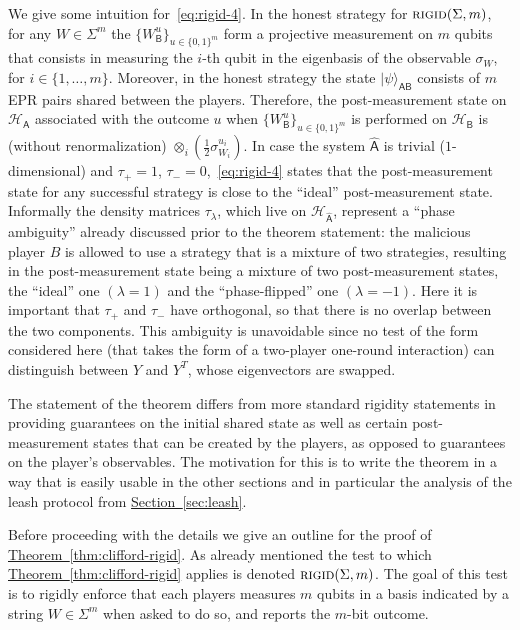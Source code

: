 \documentclass[11pt]{article}
\numberwithin{equation}{section}
\theoremstyle{definition}
\theoremstyle{plain}
\newcommand{\expref}[2]{\hyperref[#2]{#1~\ref{#2}}}
\newcommand{\ket}[1]{|#1\rangle}
\newcommand{\reg}[1]{{\textsf{#1}}}
\newcommand{\mH}{\mathcal{H}}
\newcommand{\rigid}{\textsc{rigid}}
\begin{document}
We give some intuition for~\eqref{eq:rigid-4}. In the honest strategy for $\rigid(\Sigma,m)$, for any $W\in \Sigma^m$ the $\{ W_\reg{B}^u\}_{u\in\{0,1\}^m}$ form a projective measurement on $m$ qubits that consists in measuring the $i$-th qubit in the eigenbasis of the observable $\sigma_{W}$, for $i\in\{1,\ldots,m\}$. Moreover, in the honest strategy the state $\ket{\psi}_{\reg{AB}}$ consists of $m$ EPR pairs shared between the players. Therefore, the post-measurement state on $\mH_\reg{A}$ associated with the outcome $u$ when  $\{ W_\reg{B}^u\}_{u\in\{0,1\}^m}$ is performed on $\mH_\reg{B}$ is (without renormalization) $\otimes_i (\frac{1}{2}\sigma_{W_i}^{u_i})$. In case the system $\hat{\reg{A}}$ is trivial ($1$-dimensional) and $\tau_+=1$, $\tau_-=0$,~\eqref{eq:rigid-4}  states that the post-measurement state for any successful strategy is close to the ``ideal'' post-measurement state. Informally the density matrices $\tau_\lambda$, which live on $\mH_{\hat{\reg{A}}}$, represent a ``phase ambiguity'' already discussed prior to the theorem statement: the malicious player $B$ is allowed to use a strategy that is a mixture of two strategies, resulting in the post-measurement state being a mixture of two post-measurement states, the ``ideal'' one $(\lambda=1)$ and the ``phase-flipped'' one $(\lambda=-1)$. Here it is important that $\tau_+$ and $\tau_-$ have orthogonal, so that there is no overlap between the two components. This ambiguity is unavoidable since no test of the form considered here (that takes the form of a two-player one-round interaction) can distinguish between $Y$ and $Y^T$, whose eigenvectors are swapped.  

The statement of the theorem differs from more standard rigidity statements in providing guarantees on the initial shared state as well as certain post-measurement states that can be created by the players, as opposed to guarantees on the player's observables. The motivation for this is to write the theorem in a way that is easily usable in the other sections and in particular the analysis of the leash protocol from \expref{Section}{sec:leash}. 

\medskip

Before proceeding with the details we give an outline for the proof of \expref{Theorem}{thm:clifford-rigid}. As already mentioned the test to which \expref{Theorem}{thm:clifford-rigid} applies is denoted $\rigid(\Sigma,m)$. The goal of this test is to rigidly enforce that each players measures $m$ qubits in a basis indicated by a string $W\in \Sigma^m$ when asked to do so, and reports the $m$-bit outcome. 
\end{document}
